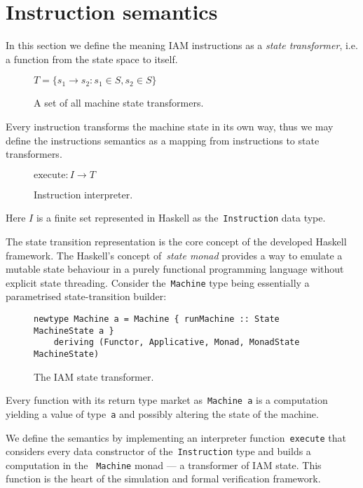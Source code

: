 \section{Instruction semantics}
\label{sec:Semantics}

In this section we define the meaning IAM instructions as a \emph{state
transformer}, i.e. a function from the state space to itself.

\begin{figure}[H]
\centering
$T = \{s_1 \rightarrow s_2 : s_1 \in S, s_2 \in S\}$
\label{}
\caption{A set of all machine state transformers.}
\end{figure}

Every instruction transforms the machine state in its own
way, thus we may define the instructions semantics as a mapping from instructions
to state transformers.

\begin{figure}[H]
\centering
$ \textrm{execute}:I \rightarrow T$
\label{}
\caption{Instruction interpreter.}
\end{figure}

Here $I$ is a finite set represented in Haskell as
the~\texttt{Instruction} data type.

The state transition representation is the core concept of the developed
Haskell framework. The Haskell's concept of~\emph{state monad} provides a way to
emulate a mutable state behaviour in a purely functional programming language
without explicit state threading. Consider the~\texttt{Machine} type being
essentially a parametrised state-transition builder:

\begin{figure}[H]
\begin{verbatim}
newtype Machine a = Machine { runMachine :: State MachineState a }
    deriving (Functor, Applicative, Monad, MonadState MachineState)
\end{verbatim}
\caption{The IAM state transformer.}
\end{figure}

Every function with its return type market as~\texttt{Machine a} is a computation
yielding a value of type~\texttt{a} and possibly altering the state of the machine.

We define the semantics by implementing an interpreter
function~\texttt{execute} that considers every data constructor of
the~\texttt{Instruction} type and builds a computation in the
~\texttt{Machine} monad --- a transformer of IAM state. This function
is the heart of the simulation and formal verification framework.

